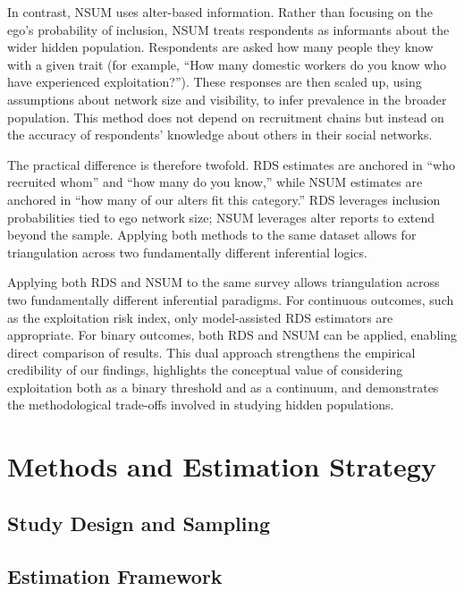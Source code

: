 \documentclass[
  12pt,
  letterpaper,
  DIV=11,
  numbers=noendperiod]{scrartcl}
\theoremstyle{plain}
\theoremstyle{definition}
\begin{document}
In contrast, NSUM uses alter-based information. Rather than focusing on
the ego's probability of inclusion, NSUM treats respondents as
informants about the wider hidden population. Respondents are asked how
many people they know with a given trait (for example, ``How many
domestic workers do you know who have experienced exploitation?'').
These responses are then scaled up, using assumptions about network size
and visibility, to infer prevalence in the broader population. This
method does not depend on recruitment chains but instead on the accuracy
of respondents' knowledge about others in their social networks.

The practical difference is therefore twofold. RDS estimates are
anchored in ``who recruited whom'' and ``how many do you know,'' while
NSUM estimates are anchored in ``how many of our alters fit this
category.'' RDS leverages inclusion probabilities tied to ego network
size; NSUM leverages alter reports to extend beyond the sample. Applying
both methods to the same dataset allows for triangulation across two
fundamentally different inferential logics.

Applying both RDS and NSUM to the same survey allows triangulation
across two fundamentally different inferential paradigms. For continuous
outcomes, such as the exploitation risk index, only model-assisted RDS
estimators are appropriate. For binary outcomes, both RDS and NSUM can
be applied, enabling direct comparison of results. This dual approach
strengthens the empirical credibility of our findings, highlights the
conceptual value of considering exploitation both as a binary threshold
and as a continuum, and demonstrates the methodological trade-offs
involved in studying hidden populations.

\section{Methods and Estimation
Strategy}\label{methods-and-estimation-strategy}

\subsection{Study Design and Sampling}\label{study-design-and-sampling}

\subsection{Estimation Framework}\label{estimation-framework}
\end{document}
